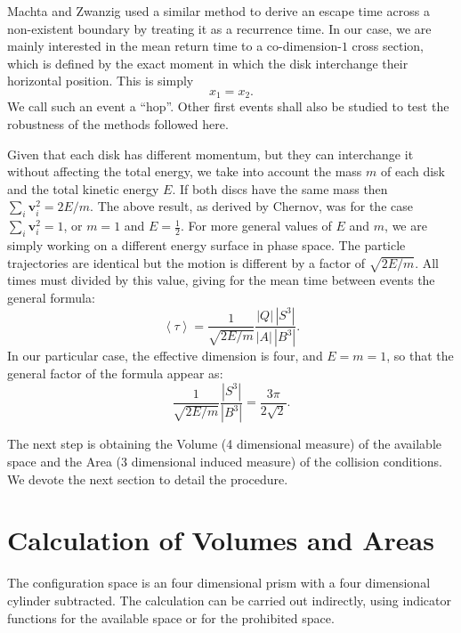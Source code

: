 \documentclass[letterpaper,10pt, jcp, aps]{revtex4-1}
\newcommand{\mean}[1]{\left \langle #1 \right \rangle}
\newcommand{\vv}{\mathbf{v}}
\begin{document}
Machta and Zwanzig \cite{MachtaZwan} used a similar method to derive an escape 
time across a non-existent boundary by treating it as a recurrence time.
In our case, we are mainly interested in the mean return time to 
a co-dimension-$1$ cross section, 
which is defined by the exact moment
in which the disk interchange their horizontal position. This is simply
\begin{equation} \label{condchoque}
x_1 = x_2.
\end{equation}
We call such an event a ``hop''. Other first events shall also be studied
to test the robustness of the methods followed here.

Given that each disk has different momentum, but
they can interchange it without affecting the
total energy, we take into account the mass $m$ of each disk 
and the total kinetic energy $E$.
If both discs have the same mass then $\sum_i \vv_i^2 = 2E / m$.
The above result, as derived by Chernov, 
was for the case $\sum_i \vv_i^2 = 1$, or $m=1$ and $E=\frac{1}{2}$.  
For more general values of $E$ and $m$, 
we are simply working on a different energy surface in phase space. 
The particle trajectories are identical but the motion is different
by a factor of
$\sqrt{2E/m}$. All times must divided by this value, 
giving for
the mean time between events the general formula:
\begin{equation} \label{meantimegeneral}
  \mean{\tau} =  \frac{1}{\sqrt{2E / m}} 
\frac{|Q| \, |S^3|} {|A| \, |B^3|}.	
\end{equation}
In our particular case, the effective dimension is four,
and $E=m=1$, so that the general factor of the formula appear as:
\begin{equation} \label{meantimegeneralredux}
   \frac{1}{\sqrt{2E / m}} 
\frac{|S^3|}{|B^3|}=\frac{3\pi}{2\sqrt{2}}.	 
\end{equation}

The next step is obtaining the Volume (4 dimensional measure) of
the available space and the Area (3 dimensional induced measure) of
the collision conditions. We devote the next section to
detail the procedure.


\section{Calculation of Volumes and Areas}

The configuration
space is an four dimensional prism with a four dimensional
cylinder subtracted.
The calculation can be carried out indirectly,
 using indicator functions for the
available space or for the prohibited space.
\end{document}
